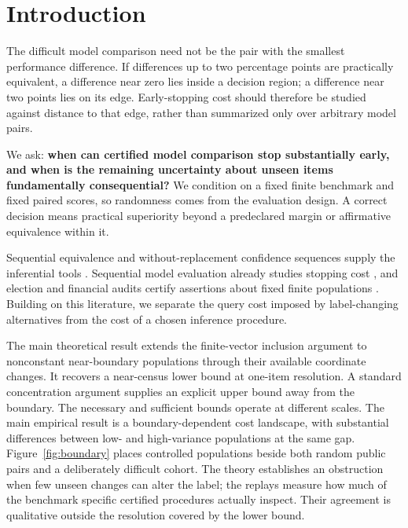 \section{Introduction}\label{sec:1}\label{introduction}

The difficult model comparison need not be the pair with the smallest performance difference. If differences up to two percentage points are practically equivalent, a difference near zero lies inside a decision region; a difference near two points lies on its edge. Early-stopping cost should therefore be studied against distance to that edge, rather than summarized only over arbitrary model pairs.

We ask: \textbf{when can certified model comparison stop substantially early, and when is the remaining uncertainty about unseen items fundamentally consequential?} We condition on a fixed finite benchmark and fixed paired scores, so randomness comes from the evaluation design. A correct decision means practical superiority beyond a predeclared margin or affirmative equivalence within it.

Sequential equivalence and without-replacement confidence sequences supply the inferential tools \citep{r1,r2}. Sequential model evaluation already studies stopping cost \citep{r3}, and election and financial audits certify assertions about fixed finite populations \citep{r18,r19,r20}. Building on this literature, we separate the query cost imposed by label-changing alternatives from the cost of a chosen inference procedure.

The main theoretical result extends the finite-vector inclusion argument to nonconstant near-boundary populations through their available coordinate changes. It recovers a near-census lower bound at one-item resolution. A standard concentration argument supplies an explicit upper bound away from the boundary. The necessary and sufficient bounds operate at different scales. The main empirical result is a boundary-dependent cost landscape, with substantial differences between low- and high-variance populations at the same gap. Figure~\ref{fig:boundary} places controlled populations beside both random public pairs and a deliberately difficult cohort. The theory establishes an obstruction when few unseen changes can alter the label; the replays measure how much of the benchmark specific certified procedures actually inspect. Their agreement is qualitative outside the resolution covered by the lower bound.
